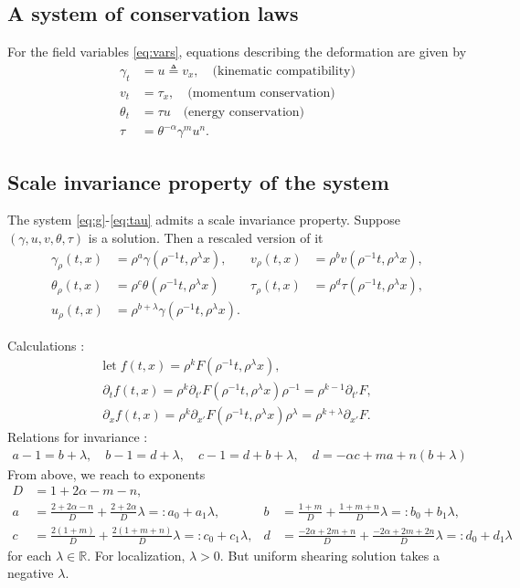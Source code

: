 \documentclass[a4paper,11pt]{article}
\begin{document}
\subsection{A system of conservation laws}
For the field variables \eqref{eq:vars}, equations describing the deformation are given by
\begin{align}
 \gamma_t &= u\triangleq v_x, \quad \text{(kinematic compatibility)} 	\label{eq:g}\\
 v_t &= \tau_x, \quad \text{(momentum conservation)} 	\label{eq:v}\\
 \theta_t &= \tau u \quad \text{(energy conservation)}	\label{eq:th}\\
 \tau &=\theta^{-\alpha}\gamma^m u^n.			\label{eq:tau}
\end{align}





\subsection{Scale invariance property of the system}
The system \eqref{eq:g}-\eqref{eq:tau} admits a scale invariance property. Suppose $(\gamma,u,v,\theta,\tau)$ is a solution. Then a rescaled version of it 
\begin{align*}
 \gamma_\rho(t,x) &= \rho^a\gamma(\rho^{-1}t,\rho^\lambda x), &
 v_\rho(t,x) &= \rho^bv(\rho^{-1}t,\rho^\lambda x),\\
 \theta_\rho(t,x) &= \rho^c\theta(\rho^{-1}t,\rho^\lambda x) &
 \tau_\rho(t,x) &= \rho^d\tau(\rho^{-1}t,\rho^\lambda x),\\
 u_\rho(t,x) &= \rho^{b+\lambda}\gamma(\rho^{-1}t,\rho^\lambda x). 
\end{align*}

Calculations :
\begin{align*}
 \text{let} \;f(t,x) = \rho^k F(\rho^{-1}t,\rho^\lambda x), \\
 \partial_t f(t,x) = \rho^k \partial_{t'} F(\rho^{-1}t,\rho^\lambda x) \rho^{-1} = \rho^{k-1} \partial_{t'}F, \\
 \partial_x f(t,x) = \rho^k \partial_{x'} F(\rho^{-1}t,\rho^\lambda x) \rho^\lambda = \rho^{k+\lambda} \partial_{x'}F.
\end{align*}
Relations for invariance :
\begin{align*}
 a-1 = b+\lambda, \quad b-1 = d+\lambda, \quad c-1 = d+b+\lambda, \quad d = -\alpha c + m a + n (b+\lambda)
\end{align*}
From above, we reach to exponents
\begin{align*}
 D & = 1+2\alpha-m-n,\\
 a&= \frac{2+2\alpha-n}{D} + \frac{2+2\alpha}{D}\lambda =: a_0 + a_1 \lambda, & b&=\frac{1+m}{D} + \frac{1+m+n}{D}\lambda =: b_0 + b_1\lambda,\\
 c&=\frac{2(1+m)}{D} + \frac{2(1+m+n)}{D}\lambda =: c_0 + c_1\lambda, & d&=\frac{-2\alpha + 2m +n}{D} + \frac{-2\alpha+2m+2n}{D}\lambda =: d_0 + d_1\lambda
\end{align*}
for each $\lambda \in \mathbb{R}$. For localization, $\lambda>0$. But uniform shearing solution takes a negative $\lambda$.
\end{document}
